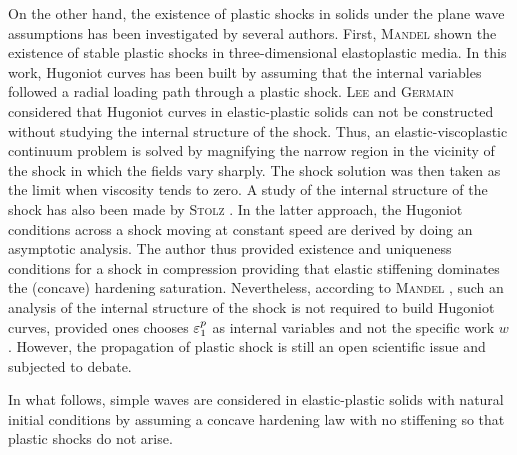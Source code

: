 On the other hand, the existence of plastic shocks in solids under the plane wave assumptions has been investigated by several authors. %
First, \textsc{Mandel} \cite{Mandel1} shown the existence of stable plastic shocks in three-dimensional elastoplastic media.
In this work, Hugoniot curves has been built by assuming that the internal variables followed a radial loading path through a plastic shock.
\textsc{Lee} and \textsc{Germain} \cite{Germain_shock} considered that Hugoniot curves in elastic-plastic solids can not be constructed without studying the internal structure of the shock.
Thus, an elastic-viscoplastic continuum problem is solved by magnifying the narrow region in the vicinity of the shock in which the fields vary sharply.
The shock solution was then taken as the limit when viscosity tends to zero.
A study of the internal structure of the shock has also been made by \textsc{Stolz} \cite{Claude}.
In the latter approach, the Hugoniot conditions across a shock moving at constant speed are derived by doing an asymptotic analysis. %
The author thus provided existence and uniqueness conditions for a shock in compression providing that elastic stiffening dominates the (concave) hardening saturation.
Nevertheless, according to \textsc{Mandel} \cite{Mandel2}, such an analysis of the internal structure of the shock is not required to build Hugoniot curves, provided ones chooses $\varepsilon^p_1$ as internal variables and not the specific work $w$.
However, the propagation of plastic shock is still an open scientific issue and subjected to debate.

In what follows, simple waves are considered in elastic-plastic solids with natural initial conditions by assuming a concave hardening law with no stiffening so that plastic shocks do not arise.





